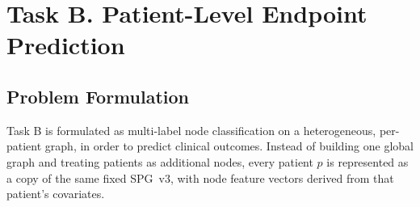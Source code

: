 \chapter{Task B. Patient-Level Endpoint Prediction}
\label{ch:taskB-method}
\label{ch:taskB-eval}

\section{Problem Formulation}
\label{sec:taskB-problem}

Task B is formulated as multi-label node classification on a heterogeneous,
per-patient graph, in order to predict clinical outcomes.
Instead of building one global graph and treating patients as additional nodes,
every patient $p$ is represented as a copy of the same fixed SPG~v3, with node
feature vectors derived from that patient's covariates.

